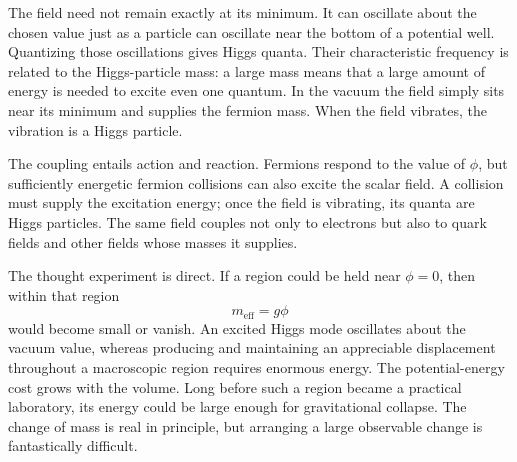 The field need not remain exactly at its minimum. It can oscillate about the chosen value just as a particle can oscillate near the bottom of a potential well. Quantizing those oscillations gives Higgs quanta. Their characteristic frequency is related to the Higgs-particle mass: a large mass means that a large amount of energy is needed to excite even one quantum. In the vacuum the field simply sits near its minimum and supplies the fermion mass. When the field vibrates, the vibration is a Higgs particle.

The coupling entails action and reaction. Fermions respond to the value of \(\phi\), but sufficiently energetic fermion collisions can also excite the scalar field. A collision must supply the excitation energy; once the field is vibrating, its quanta are Higgs particles. The same field couples not only to electrons but also to quark fields and other fields whose masses it supplies.

\begin{classroomqa}
\end{classroomqa}

The thought experiment is direct. If a region could be held near \(\phi=0\), then within that region
\begin{equation}
m_{\mathrm{eff}}=g\phi
\end{equation}
would become small or vanish. An excited Higgs mode oscillates about the vacuum value, whereas producing and maintaining an appreciable displacement throughout a macroscopic region requires enormous energy. The potential-energy cost grows with the volume. Long before such a region became a practical laboratory, its energy could be large enough for gravitational collapse. The change of mass is real in principle, but arranging a large observable change is fantastically difficult.

\begin{classroomqa}
\end{classroomqa}

